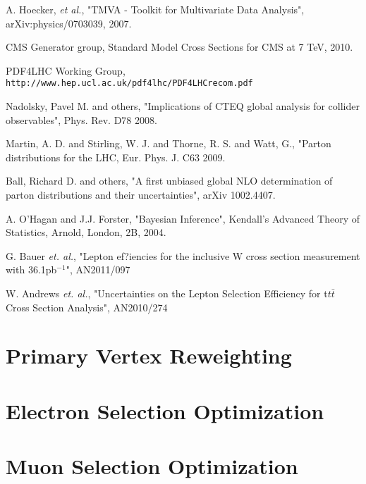 \documentclass{cmspaper}
\begin{document}
A. Hoecker, \textit{et al.}, "TMVA - Toolkit for Multivariate Data Analysis", arXiv:physics/0703039, 2007.

CMS Generator group, Standard Model Cross Sections for CMS at 7 TeV, 2010.

PDF4LHC Working Group, 
{\tt http://www.hep.ucl.ac.uk/pdf4lhc/PDF4LHCrecom.pdf}

Nadolsky, Pavel M. and others, "Implications of CTEQ global analysis for 
collider observables", Phys. Rev. D78 2008.

Martin, A. D. and Stirling, W. J. and Thorne, R. S. and Watt, G., "Parton 
distributions for the LHC, Eur. Phys. J. C63 2009.

Ball, Richard D. and others, "A first unbiased global NLO determination 
of parton distributions and their uncertainties", arXiv 1002.4407.

A. O'Hagan and J.J. Forster, "Bayesian Inference", Kendall's Advanced Theory of Statistics, 
Arnold, London, 2B, 2004.

G. Bauer {\it et. al.}, "Lepton ef?iencies for the inclusive W cross section measurement with 36.1pb$^{-1}$", AN2011/097

W. Andrews {\it et. al.}, "Uncertainties on the Lepton Selection Efficiency for t$t\bar{t}$ Cross Section Analysis", AN2010/274


\appendix
\appendixpage
  \section{Primary Vertex Reweighting}
     \label{app:vertex_reweight}
     
  \clearpage
  \section{Electron Selection Optimization}
     \label{app:els}
     
  \clearpage
  \section{Muon Selection Optimization}
     \label{app:mus}
     
  \clearpage
%     
  \clearpage
\end{document}

